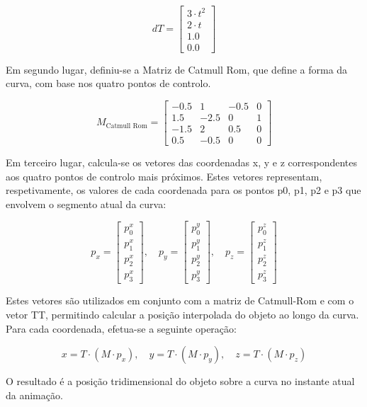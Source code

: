 \documentclass[12pt, a4paper]{article}
\begin{document}
$$
dT = \begin{bmatrix} 3 \cdot t^2 \\ 2 \cdot t \\ 1.0 \\ 0.0 \end{bmatrix}
$$

Em segundo lugar, definiu-se a Matriz de Catmull Rom, que define a forma da curva,
com base nos quatro pontos de controlo.

$$
M_{\text{Catmull Rom}} =
\begin{bmatrix}
    -0.5 & 1   & -0.5 & 0 \\
    1.5  & -2.5 & 0    & 1 \\
    -1.5 & 2   & 0.5  & 0 \\
    0.5  & -0.5 & 0    & 0
\end{bmatrix}
$$

Em terceiro lugar, calcula-se os vetores das coordenadas x, y e z correspondentes
aos quatro pontos de controlo mais próximos. Estes vetores representam, respetivamente,
os valores de cada coordenada para os pontos p0, p1, p2 e p3 que envolvem o
segmento atual da curva:

$$
{p}_x = \begin{bmatrix} p_0^x \\ p_1^x \\ p_2^x \\ p_3^x \end{bmatrix}, \quad
{p}_y = \begin{bmatrix} p_0^y \\ p_1^y \\ p_2^y \\ p_3^y \end{bmatrix}, \quad
{p}_z = \begin{bmatrix} p_0^z \\ p_1^z \\ p_2^z \\ p_3^z \end{bmatrix}
$$

Estes vetores são utilizados em conjunto com a matriz de Catmull-Rom e com o vetor TT,
permitindo calcular a posição interpolada do objeto ao longo da curva. Para cada coordenada,
efetua-se a seguinte operação:

$$
x = {T} \cdot ({M} \cdot {p}_x), \quad
y = {T} \cdot ({M} \cdot {p}_y), \quad
z = {T} \cdot ({M} \cdot {p}_z)
$$

O resultado é a posição tridimensional do objeto sobre a curva no instante atual da animação.
\end{document}
